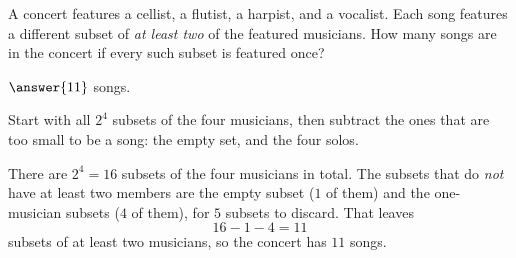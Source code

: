 \documentclass[12pt]{ximera}
\begin{document}
\begin{problem}
A concert features a cellist, a flutist, a harpist, and a vocalist. Each song
features a different subset of \emph{at least two} of the featured musicians. How
many songs are in the concert if every such subset is featured once?

$\answer{11}$ songs.

\begin{hint}
Start with all $2^4$ subsets of the four musicians, then subtract the ones that are
too small to be a song: the empty set, and the four solos.
\end{hint}

\begin{solution}
There are $2^4=16$ subsets of the four musicians in total. The subsets that do
\emph{not} have at least two members are the empty subset ($1$ of them) and the
one-musician subsets ($4$ of them), for $5$ subsets to discard. That leaves
\[ 16 - 1 - 4 = 11 \]
subsets of at least two musicians, so the concert has $11$ songs.
\end{solution}
\end{problem}
\end{document}
